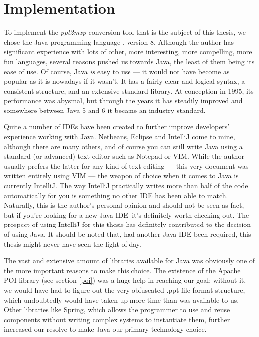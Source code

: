 
 \chapter{Implementation}

  To implement the \emph{ppt2mxp} conversion tool that is the subject of this
  thesis, we chose the Java programming language \citep{gosling-1}, version 8.
  Although the author has significant experience with lots of other, more
  interesting, more compelling, more fun languages, several reasons pushed us
  towards Java, the least of them being its ease of use. Of course, Java
  \emph{is} easy to use --- it would not have become as popular as it is
  nowadays if it wasn't. It has a fairly clear and logical syntax, a consistent
  structure, and an extensive standard library. At conception in 1995, its
  performance was abysmal, but through the years it has steadily improved and
  somewhere between Java 5 and 6 it became an industry standard.

  Quite a number of IDEs have been created to further improve developers'
  experience working with Java. Netbeans, Eclipse and IntelliJ come to mine,
  although there are many others, and of course you can still write Java using
  a standard (or advanced) text editor such as Notepad or VIM. While the author
  usually prefers the latter for any kind of text editing --- this very
  document was written entirely using VIM --- the weapon of choice when it
  comes to Java is currently IntelliJ. The way IntelliJ practically writes more
  than half of the code automatically for you is something no other IDE has
  been able to match. Naturally, this is the author's personal opinion and
  should not be seen as fact, but if you're looking for a new Java IDE, it's
  definitely worth checking out. The prospect of using IntelliJ for this thesis
  has definitely contributed to the decision of using Java. It should be noted
  that, had another Java IDE been required, this thesis might never have seen
  the light of day.

  The vast and extensive amount of libraries available for Java was obviously
  one of the more important reasons to make this choice. The existence of the
  Apache POI library (see section \ref{poi}) was a huge help in reaching our
  goal; without it, we would have had to figure out the very obfuscated .ppt
  file format structure, which undoubtedly would have taken up more time than
  was available to us. Other libraries like Spring, which allows the programmer
  to use and reuse components without writing complex systems to instantiate
  them, further increased our resolve to make Java our primary technology
  choice.

